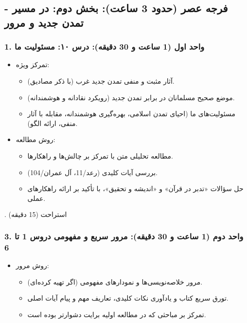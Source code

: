 \documentclass{article}
\begin{document}
\bigskip
\hrulefill
\bigskip

\subsection*{فرجه عصر (حدود 3 ساعت): بخش دوم: در مسیر - تمدن جدید و مرور}

\subsubsection*{1. واحد اول (1 ساعت و 30 دقیقه): درس ۱۰: مسئولیت ما}
\begin{itemize}
    \item تمرکز ویژه:
    \begin{itemize}
        \item آثار مثبت و منفی تمدن جدید غرب (با ذکر مصادیق).
        \item موضع صحیح مسلمانان در برابر تمدن جدید (رویکرد نقادانه و هوشمندانه).
        \item مسئولیت‌های ما (احیای تمدن اسلامی، بهره‌گیری هوشمندانه، مقابله با آثار منفی، ارائه الگو).
    \end{itemize}
    \item روش مطالعه:
    \begin{itemize}
        \item مطالعه تحلیلی متن با تمرکز بر چالش‌ها و راهکارها.
        \item بررسی آیات کلیدی (رعد/11، آل عمران/104).
        \item حل سؤالات «تدبر در قرآن» و «اندیشه و تحقیق»، با تأکید بر ارائه راهکارهای عملی.
    \end{itemize}
\end{itemize}

\vspace{\baselineskip}
. استراحت (15 دقیقه)
\vspace{\baselineskip}

\subsubsection*{3. واحد دوم (1 ساعت و 30 دقیقه): مرور سریع و مفهومی دروس 1 تا 6}
\begin{itemize}
    \item روش مرور:
    \begin{itemize}
        \item مرور خلاصه‌نویسی‌ها و نمودارهای مفهومی (اگر تهیه کرده‌ای).
        \item تورق سریع کتاب و یادآوری نکات کلیدی، تعاریف مهم و پیام آیات اصلی.
        \item تمرکز بر مباحثی که در مطالعه اولیه برایت دشوارتر بوده است.
    \end{itemize}
\end{itemize}
\end{document}
